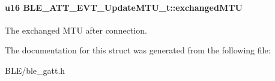\paragraph[{\texorpdfstring{exchanged\+M\+TU}{exchangedMTU}}]{\setlength{\rightskip}{0pt plus 5cm}u16 B\+L\+E\+\_\+\+A\+T\+T\+\_\+\+E\+V\+T\+\_\+\+Update\+M\+T\+U\+\_\+t\+::exchanged\+M\+TU}\hypertarget{struct_b_l_e___a_t_t___e_v_t___update_m_t_u__t_a34cc079e6441f922db99270ed25d881d}{}\label{struct_b_l_e___a_t_t___e_v_t___update_m_t_u__t_a34cc079e6441f922db99270ed25d881d}
The exchanged M\+TU after connection. 

The documentation for this struct was generated from the following file\+:\begin{DoxyCompactItemize}
\item 
B\+L\+E/ble\+\_\+gatt.\+h\end{DoxyCompactItemize}
